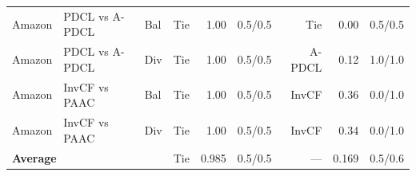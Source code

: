 \begin{table}[t]
{\begin{tabular}{ll l rrr rrr}
Amazon & PDCL vs A-PDCL & Bal & Tie & 1.00 & 0.5/0.5 & Tie & 0.00 & 0.5/0.5 \\
Amazon & PDCL vs A-PDCL & Div & Tie & 1.00 & 0.5/0.5 & A-PDCL & 0.12 & 1.0/1.0 \\
Amazon & InvCF vs PAAC & Bal & Tie & 1.00 & 0.5/0.5 & InvCF & 0.36 & 0.0/1.0 \\
Amazon & InvCF vs PAAC & Div & Tie & 1.00 & 0.5/0.5 & InvCF & 0.34 & 0.0/1.0 \\
\midrule
\multicolumn{3}{l}{\textbf{Average}} & Tie & 0.985 & 0.5/0.5 & --- & 0.169 & 0.5/0.6 \\
\bottomrule
\end{tabular}}
\end{table}
